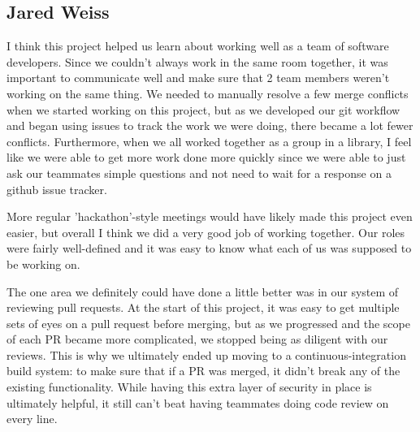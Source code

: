 \documentclass{article}
\begin{document}
\subsection{Jared Weiss}
I think this project helped us learn about working well as a team of software developers. Since we couldn't always work in the same room together, it was important to communicate well and make sure that 2 team members weren't working on the same thing. We needed to manually resolve a few merge conflicts when we started working on this project, but as we developed our git workflow and began using issues to track the work we were doing, there became a lot fewer conflicts. Furthermore, when we all worked together as a group in a library, I feel like we were able to get more work done more quickly since we were able to just ask our teammates simple questions and not need to wait for a response on a github issue tracker. 

More regular 'hackathon'-style meetings would have likely made this project even easier, but overall I think we did a very good job of working together. Our roles were fairly well-defined and it was easy to know what each of us was supposed to be working on. 

The one area we definitely could have done a little better was in our system of reviewing pull requests. At the start of this project, it was easy to get multiple sets of eyes on a pull request before merging, but as we progressed and the scope of each PR became more complicated, we stopped being as diligent with our reviews. This is why we ultimately ended up moving to a continuous-integration build system: to make sure that if a PR was merged, it didn't break any of the existing functionality. While having this extra layer of security in place is ultimately helpful, it still can't beat having teammates doing code review on every line. 
\end{document}
